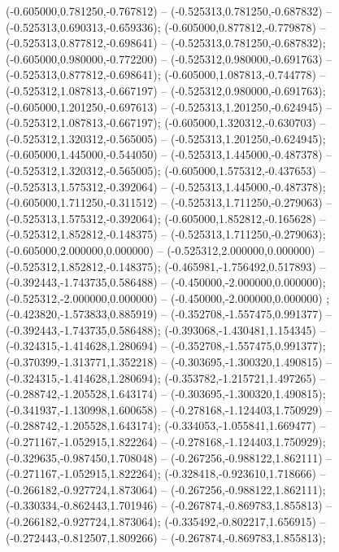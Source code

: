  (-0.605000,0.781250,-0.767812) -- (-0.525313,0.781250,-0.687832) -- (-0.525313,0.690313,-0.659336);
 (-0.605000,0.877812,-0.779878) -- (-0.525313,0.877812,-0.698641) -- (-0.525313,0.781250,-0.687832);
 (-0.605000,0.980000,-0.772200) -- (-0.525312,0.980000,-0.691763) -- (-0.525313,0.877812,-0.698641);
 (-0.605000,1.087813,-0.744778) -- (-0.525312,1.087813,-0.667197) -- (-0.525312,0.980000,-0.691763);
 (-0.605000,1.201250,-0.697613) -- (-0.525313,1.201250,-0.624945) -- (-0.525312,1.087813,-0.667197);
 (-0.605000,1.320312,-0.630703) -- (-0.525312,1.320312,-0.565005) -- (-0.525313,1.201250,-0.624945);
 (-0.605000,1.445000,-0.544050) -- (-0.525313,1.445000,-0.487378) -- (-0.525312,1.320312,-0.565005);
 (-0.605000,1.575312,-0.437653) -- (-0.525313,1.575312,-0.392064) -- (-0.525313,1.445000,-0.487378);
 (-0.605000,1.711250,-0.311512) -- (-0.525313,1.711250,-0.279063) -- (-0.525313,1.575312,-0.392064);
 (-0.605000,1.852812,-0.165628) -- (-0.525312,1.852812,-0.148375) -- (-0.525313,1.711250,-0.279063);
 (-0.605000,2.000000,0.000000) -- (-0.525312,2.000000,0.000000) -- (-0.525312,1.852812,-0.148375);
 (-0.465981,-1.756492,0.517893) -- (-0.392443,-1.743735,0.586488) -- (-0.450000,-2.000000,0.000000);
 (-0.525312,-2.000000,0.000000) -- (-0.450000,-2.000000,0.000000) ;
 (-0.423820,-1.573833,0.885919) -- (-0.352708,-1.557475,0.991377) -- (-0.392443,-1.743735,0.586488);
 (-0.393068,-1.430481,1.154345) -- (-0.324315,-1.414628,1.280694) -- (-0.352708,-1.557475,0.991377);
 (-0.370399,-1.313771,1.352218) -- (-0.303695,-1.300320,1.490815) -- (-0.324315,-1.414628,1.280694);
 (-0.353782,-1.215721,1.497265) -- (-0.288742,-1.205528,1.643174) -- (-0.303695,-1.300320,1.490815);
 (-0.341937,-1.130998,1.600658) -- (-0.278168,-1.124403,1.750929) -- (-0.288742,-1.205528,1.643174);
 (-0.334053,-1.055841,1.669477) -- (-0.271167,-1.052915,1.822264) -- (-0.278168,-1.124403,1.750929);
 (-0.329635,-0.987450,1.708048) -- (-0.267256,-0.988122,1.862111) -- (-0.271167,-1.052915,1.822264);
 (-0.328418,-0.923610,1.718666) -- (-0.266182,-0.927724,1.873064) -- (-0.267256,-0.988122,1.862111);
 (-0.330334,-0.862443,1.701946) -- (-0.267874,-0.869783,1.855813) -- (-0.266182,-0.927724,1.873064);
 (-0.335492,-0.802217,1.656915) -- (-0.272443,-0.812507,1.809266) -- (-0.267874,-0.869783,1.855813);
